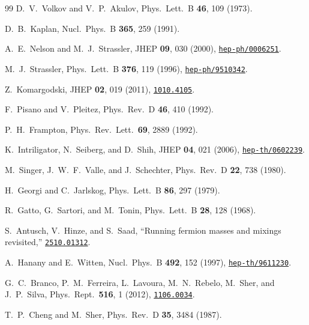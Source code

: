 \documentclass[12pt,a4paper]{article}
\begin{document}
\begin{thebibliography}{99}
  D.~V.~Volkov and V.~P.~Akulov,
  Phys.\ Lett.\ B \textbf{46}, 109 (1973).

  D.~B.~Kaplan,
  Nucl.\ Phys.\ B \textbf{365}, 259 (1991).

  A.~E.~Nelson and M.~J.~Strassler,
  JHEP \textbf{09}, 030 (2000),
  \href{https://arxiv.org/abs/hep-ph/0006251}{\texttt{hep-ph/0006251}}.

  M.~J.~Strassler,
  Phys.\ Lett.\ B \textbf{376}, 119 (1996),
  \href{https://arxiv.org/abs/hep-ph/9510342}{\texttt{hep-ph/9510342}}.

  Z.~Komargodski,
  JHEP \textbf{02}, 019 (2011),
  \href{https://arxiv.org/abs/1010.4105}{\texttt{1010.4105}}.

  F.~Pisano and V.~Pleitez,
  Phys.\ Rev.\ D \textbf{46}, 410 (1992).

  P.~H.~Frampton,
  Phys.\ Rev.\ Lett.\ \textbf{69}, 2889 (1992).

  K.~Intriligator, N.~Seiberg, and D.~Shih,
  JHEP \textbf{04}, 021 (2006),
  \href{https://arxiv.org/abs/hep-th/0602239}{\texttt{hep-th/0602239}}.



  M.~Singer, J.~W.~F.~Valle, and J.~Schechter,
  Phys.\ Rev.\ D \textbf{22}, 738 (1980).

  H.~Georgi and C.~Jarlskog,
  Phys.\ Lett.\ B \textbf{86}, 297 (1979).

  R.~Gatto, G.~Sartori, and M.~Tonin,
  Phys.\ Lett.\ B \textbf{28}, 128 (1968).

  S.~Antusch, V.~Hinze, and S.~Saad,
  ``Running fermion masses and mixings revisited,''
  \href{https://arxiv.org/abs/2510.01312}{\texttt{2510.01312}}.

  A.~Hanany and E.~Witten,
  Nucl.\ Phys.\ B \textbf{492}, 152 (1997),
  \href{https://arxiv.org/abs/hep-th/9611230}{\texttt{hep-th/9611230}}.

  G.~C.~Branco, P.~M.~Ferreira, L.~Lavoura, M.~N.~Rebelo,
  M.~Sher, and J.~P.~Silva,
  Phys.\ Rept.\ \textbf{516}, 1 (2012),
  \href{https://arxiv.org/abs/1106.0034}{\texttt{1106.0034}}.

  T.~P.~Cheng and M.~Sher,
  Phys.\ Rev.\ D \textbf{35}, 3484 (1987).


\end{thebibliography}
\end{document}
